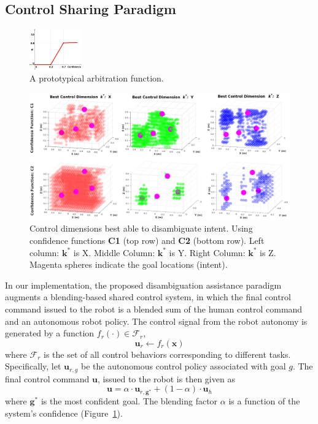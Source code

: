 \documentclass[conference]{IEEEtran}
\begin{document}
\subsection{Control Sharing Paradigm}\label{BP}
\begin{figure}
	\begin{center}
		\vspace{-0.9cm}
		\includegraphics[width=0.2\textwidth]{./figures/ArbFunc_New1.png}
	\end{center}
	\vspace{-.3cm}
	\caption{A prototypical arbitration function.}
	\label{ALPHA}
\end{figure}
\begin{figure}[ht]
	\centering
	\includegraphics[width = 1\hsize, height = 0.35\vsize]{./figures/POINT_CLOUD.png}
	\caption{Control dimensions best able to disambiguate intent. Using confidence functions \textbf{C1} (top row) and \textbf{C2} (bottom row). Left column: $\boldsymbol{k}^*$ is X. Middle Column: $\boldsymbol{k}^*$ is Y. Right Column: $\boldsymbol{k}^*$ is Z. Magenta spheres indicate the goal locations (intent).}
	\label{HM_SEP}
\end{figure}
In our implementation, the proposed disambiguation assistance paradigm augments a blending-based shared control system, in which the final control command issued to the robot is a blended sum of the human control command and an autonomous robot policy. 
The control signal from the robot autonomy is generated by a function $f_{r}(\cdot) \in \mathcal{F}_{r}$, 
\begin{equation*}
\boldsymbol{u}_r \leftarrow f_{r}(\boldsymbol{x})
\end{equation*}
where $\mathcal{F}_{r}$ is the set of all control behaviors corresponding to different tasks.
Specifically, let $\boldsymbol{u}_{r,g}$ be the autonomous control policy associated with goal $g$. The final control command $\boldsymbol{u}$, issued to the robot is then given as 
\begin{equation*}
\boldsymbol{u} = \alpha\cdot \boldsymbol{u}_{r,\boldsymbol{g}^*} + (1 - \alpha)\cdot \boldsymbol{u}_h
\end{equation*}
where $\boldsymbol{g}^*$ is the most confident goal. The blending factor $\alpha$ is a function of the system's confidence (Figure~\ref{ALPHA}).
\end{document}
